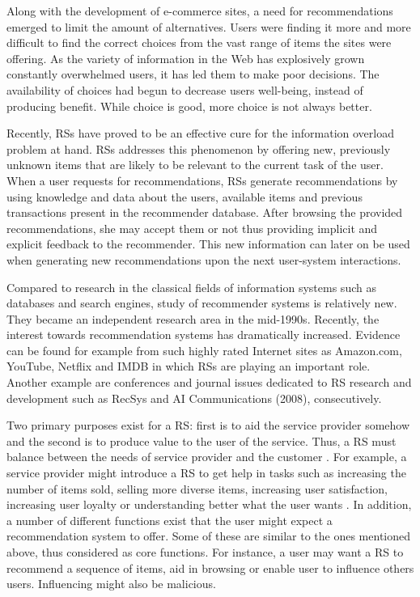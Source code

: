 \documentclass[main.tex]{thesis.tex}
\begin{document}
Along with the development of e-commerce sites, a need for recommendations emerged to limit the amount of alternatives.
Users were finding it more and more difficult to find the correct choices from the vast range of items the sites were offering.
As the variety of information in the Web has explosively grown constantly overwhelmed users, it has led them to make poor decisions.
The availability of choices had begun to decrease users well-being, instead of producing benefit.
While choice is good, more choice is not always better. \cite{ricci11}

Recently, RSs have proved to be an effective cure for the information overload problem at hand.
RSs addresses this phenomenon by offering new, previously unknown items that are likely to be relevant to the current task of the user.
When a user requests for recommendations, RSs generate recommendations by using knowledge and data about the users, available items and previous transactions present in the recommender database.
After browsing the provided recommendations, she may accept them or not thus providing implicit and explicit feedback to the recommender.
This new information can later on be used when generating new recommendations upon the next user-system interactions. \cite{ricci11}

Compared to research in the classical fields of information systems such as databases and search engines, study of recommender systems is relatively new.
They became an independent research area in the mid-1990s. Recently, the interest towards recommendation systems has dramatically increased.
Evidence can be found for example from such highly rated Internet sites as Amazon.com, YouTube, Netflix and IMDB in which RSs are playing an important role.
Another example are conferences and journal issues dedicated to RS research and development such as RecSys and AI Communications (2008), consecutively. \cite{ricci11}

Two primary purposes exist for a RS: first is to aid the service provider somehow and the second is to produce value to the user of the service.
Thus, a RS must balance between the needs of service provider and the customer \cite{ricci11}.
For example, a service provider might introduce a RS to get help in tasks such as increasing the number of items sold, selling more diverse items, increasing user satisfaction, increasing user loyalty or understanding better what the user wants \cite{ricci11}.
In addition, a number of different functions exist that the user might expect a recommendation system to offer. Some of these are similar to the ones mentioned above, thus considered as core functions.
For instance, a user may want a RS to recommend a sequence of items, aid in browsing or enable user to influence others users. Influencing might also be malicious. \cite{ricci11}
\end{document}
